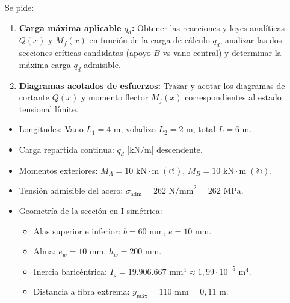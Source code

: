 Se pide:
\begin{enumerate}[label=\alph*)]
    \item \textbf{Carga máxima aplicable $q_d$:} Obtener las reacciones y leyes analíticas $Q(x)$ y $M_f(x)$ en función de la carga de cálculo $q_d$, analizar las dos secciones críticas candidatas (apoyo $B$ vs vano central) y determinar la máxima carga $q_d$ admisible.
    \item \textbf{Diagramas acotados de esfuerzos:} Trazar y acotar los diagramas de cortante $Q(x)$ y momento flector $M_f(x)$ correspondientes al estado tensional límite.
\end{enumerate}

\begin{tcolorbox}[colback=blue!5!white,colframe=blue!75!black,title=\textbf{Datos del Problema (Enunciado 2020)}]
    \begin{itemize}
        \item Longitudes: Vano $L_1 = 4\text{ m}$, voladizo $L_2 = 2\text{ m}$, total $L = 6\text{ m}$.
        \item Carga repartida continua: $q_d\text{ [kN/m]}$ descendente.
        \item Momentos exteriores: $M_A = 10\text{ kN}\cdot\text{m}\;(\circlearrowleft)$, $M_B = 10\text{ kN}\cdot\text{m}\;(\circlearrowright)$.
        \item Tensión admisible del acero: $\sigma_{\text{adm}} = 262\text{ N/mm}^2 = 262\text{ MPa}$.
        \item Geometría de la sección en I simétrica:
              \begin{itemize}
                  \item Alas superior e inferior: $b = 60\text{ mm}$, $e = 10\text{ mm}$.
                  \item Alma: $e_w = 10\text{ mm}$, $h_w = 200\text{ mm}$.
                  \item Inercia baricéntrica: $I_z = 19.906.667\text{ mm}^4 \approx 1{,}99 \cdot 10^{-5}\text{ m}^4$.
                  \item Distancia a fibra extrema: $y_{\text{máx}} = 110\text{ mm} = 0{,}11\text{ m}$.
              \end{itemize}
    \end{itemize}
\end{tcolorbox}

